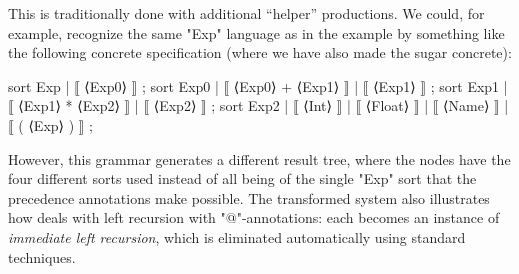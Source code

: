\documentclass[11pt]{article} %
\begin{document}
{\small\begin{remark}
This is traditionally done with additional ``helper'' productions. We could, for example, recognize
the same "Exp" language as in the example by something like the following concrete \HAX
specification (where we have also made the sugar concrete):
\begin{hacs}[xleftmargin=\parindent]
sort Exp   | ⟦ ⟨Exp0⟩ ⟧ ;
sort Exp0  | ⟦ ⟨Exp0⟩ + ⟨Exp1⟩ ⟧ | ⟦ ⟨Exp1⟩ ⟧ ;
sort Exp1  | ⟦ ⟨Exp1⟩ * ⟨Exp2⟩ ⟧ | ⟦ ⟨Exp2⟩ ⟧ ;
sort Exp2  | ⟦ ⟨Int⟩ ⟧ | ⟦ ⟨Float⟩ ⟧ | ⟦ ⟨Name⟩ ⟧ | ⟦ ( ⟨Exp⟩ ) ⟧ ;
\end{hacs}%
However, this grammar generates a different result tree, where the nodes have the four different
sorts used instead of all being of the single "Exp" sort that the precedence annotations make
possible.  The transformed system also illustrates how \HAX deals with left recursion with
"@"-annotations: each becomes an instance of \emph{immediate left recursion}, which is eliminated
automatically using standard techniques.
\end{remark}}
\end{document}
